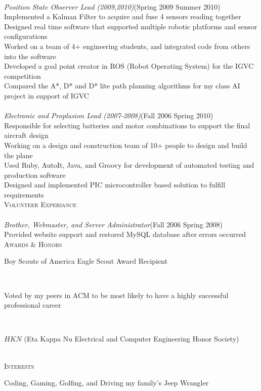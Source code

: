 \documentclass[10pt,a4paper,oneside]{article}
\newcommand{\SectionHeader}[1]{\textsc{#1} \vspace{-2px}\\}
\newcommand{\CompanyHeader}[4]{\hspace*{.52in}{\bf#1} \hfill #2 \\\hspace*{.5in}\emph{#3}\hfill (#4) \\}
\newcommand{\ResumeItem}[1]{\hspace*{.5in}\textopenbullet\hspace*{.2in}#1\\}
\newcommand{\TextBlock}[1]
{\hspace*{.5in} \begin{minipage}[t]{6.75in} #1 \end{minipage}\\}
\begin{document}
\CompanyHeader{Intelligent Ground Vehicle Competition (IGVC)}{}{Position State Observer Lead (2009,2010)}{Spring 2009 \textendash { }Summer 2010}
 \ResumeItem{Implemented a Kalman Filter to acquire and fuse 4 sensors reading together}
 \ResumeItem{Designed real time software that supported multiple robotic platforms and sensor configurations}
 \ResumeItem{Worked on a team of 4+ engineering students, and integrated code from others into the software}
 \ResumeItem{Developed a goal point creator in ROS (Robot Operating System) for the IGVC competition}
 \ResumeItem{Compared the A*, D* and D* lite path planning algorithms for my class AI project in support of IGVC}
 \CompanyHeader{Design Build Fly/DBF}{}{Electronic and Proplusion Lead (2007-2008)}{Fall 2006 \textendash { }Spring 2010}
 \ResumeItem{Responsible for selecting batteries and motor combinations to support the final aircraft design}
 \ResumeItem{Working on a design and construction team of 10+ people to design and build the plane}
 \ResumeItem{Used Ruby, AutoIt, Java, and Groovy for development of automated testing and production software} 
\ResumeItem{Designed and implemented PIC microcontroller based solution to fulfill requirements}
\SectionHeader{Volunteer Experiance}
 \CompanyHeader{Alpha Phi Omega (National Service Fraternity)}{}{Brother, Webmaster, and Server Administrator}{Fall 2006 \textendash { }Spring 2008}
 \ResumeItem{Provided website support and restored MySQL database after errors occurred}
\SectionHeader{Awards \& Honors}
\TextBlock{Boy Scouts of America Eagle Scout Award Recipient}
\TextBlock{Voted by my peers in ACM to be most likely to have a highly successful professional career}
\TextBlock{$HKN$ (Eta Kappa Nu Electrical and Computer Engineering Honor Society)}
\SectionHeader{Interests}
\TextBlock{Coding, Gaming, Golfing, and Driving my family’s Jeep Wrangler}
\end{document}
